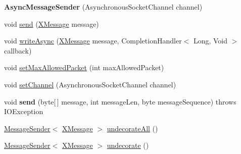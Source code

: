 \begin{DoxyCompactItemize}
\item 
\mbox{\label{classcom_1_1mysql_1_1cj_1_1protocol_1_1x_1_1_async_message_sender_a60d8f512862f503f0e63da3bad608966}} 
{\bfseries Async\+Message\+Sender} (Asynchronous\+Socket\+Channel channel)
\item 
void \mbox{\hyperlink{classcom_1_1mysql_1_1cj_1_1protocol_1_1x_1_1_async_message_sender_a6fbc4d4b6b0e9a94cdec20e3c9efb904}{send}} (\mbox{\hyperlink{classcom_1_1mysql_1_1cj_1_1protocol_1_1x_1_1_x_message}{X\+Message}} message)
\item 
void \mbox{\hyperlink{classcom_1_1mysql_1_1cj_1_1protocol_1_1x_1_1_async_message_sender_a405a11dfc5f673ba7e8dbb1410bf25f9}{write\+Async}} (\mbox{\hyperlink{classcom_1_1mysql_1_1cj_1_1protocol_1_1x_1_1_x_message}{X\+Message}} message, Completion\+Handler$<$ Long, Void $>$ callback)
\item 
void \mbox{\hyperlink{classcom_1_1mysql_1_1cj_1_1protocol_1_1x_1_1_async_message_sender_a9350fb34edd02d90eebe96812dd85e25}{set\+Max\+Allowed\+Packet}} (int max\+Allowed\+Packet)
\item 
void \mbox{\hyperlink{classcom_1_1mysql_1_1cj_1_1protocol_1_1x_1_1_async_message_sender_aa71e26100605a3dbb3f575c839769d3e}{set\+Channel}} (Asynchronous\+Socket\+Channel channel)
\item 
\mbox{\label{classcom_1_1mysql_1_1cj_1_1protocol_1_1x_1_1_async_message_sender_a8dd20b5008f9f8f6a5d294269b0d8e0e}} 
void {\bfseries send} (byte\mbox{[}$\,$\mbox{]} message, int message\+Len, byte message\+Sequence)  throws I\+O\+Exception 
\item 
\mbox{\hyperlink{interfacecom_1_1mysql_1_1cj_1_1protocol_1_1_message_sender}{Message\+Sender}}$<$ \mbox{\hyperlink{classcom_1_1mysql_1_1cj_1_1protocol_1_1x_1_1_x_message}{X\+Message}} $>$ \mbox{\hyperlink{classcom_1_1mysql_1_1cj_1_1protocol_1_1x_1_1_async_message_sender_ad00ea2b9a6d74feb32a301410fc829f0}{undecorate\+All}} ()
\item 
\mbox{\hyperlink{interfacecom_1_1mysql_1_1cj_1_1protocol_1_1_message_sender}{Message\+Sender}}$<$ \mbox{\hyperlink{classcom_1_1mysql_1_1cj_1_1protocol_1_1x_1_1_x_message}{X\+Message}} $>$ \mbox{\hyperlink{classcom_1_1mysql_1_1cj_1_1protocol_1_1x_1_1_async_message_sender_a4e7623346f23221fb9ff562c11c851e6}{undecorate}} ()
\end{DoxyCompactItemize}


